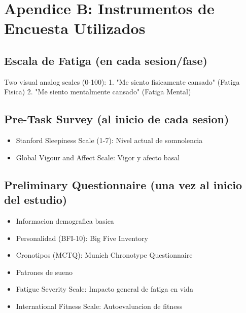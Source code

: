 \section*{Apendice B: Instrumentos de Encuesta Utilizados}

\subsection*{Escala de Fatiga (en cada sesion/fase)}

Two visual analog scales (0-100):
1. "Me siento fisicamente cansado" (Fatiga Fisica)
2. "Me siento mentalmente cansado" (Fatiga Mental)

\subsection*{Pre-Task Survey (al inicio de cada sesion)}

\begin{itemize}
    \item Stanford Sleepiness Scale (1-7): Nivel actual de somnolencia
    \item Global Vigour and Affect Scale: Vigor y afecto basal
\end{itemize}

\subsection*{Preliminary Questionnaire (una vez al inicio del estudio)}

\begin{itemize}
    \item Informacion demografica basica
    \item Personalidad (BFI-10): Big Five Inventory
    \item Cronotipos (MCTQ): Munich Chronotype Questionnaire
    \item Patrones de sueno
    \item Fatigue Severity Scale: Impacto general de fatiga en vida
    \item International Fitness Scale: Autoevaluacion de fitness
\end{itemize}

